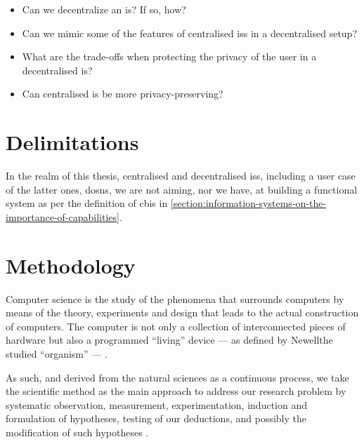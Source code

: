 \documentclass[showtrims, oldfontcommands]{kthesis}
\begin{document}
\begin{itemize}
    \item Can we decentralize an \ac{is}? If so, how?\\
    \item Can we mimic some of the features of centralised \acp{is} in a decentralised setup?\\
    \item What are the trade-offs when protecting the privacy of the user in a decentralised \ac{is}?\\
    \item Can centralised \ac{is} be more privacy-preserving?\\
\end{itemize}

\section{Delimitations}
    \label{section:delimitations}
In the realm of this thesis, centralised and decentralised \acp{is}, including a 
user case of the latter ones, \acp{dosn}, we are not aiming, nor we have, at building 
a functional system as per the definition of \ac{cbis} in \cref{section:information-systems-on-the-importance-of-capabilities}.

\section{Methodology}
    \label{section:methodoloy}
Computer science is the study of the phenomena that surrounds computers by means 
of the theory, experiments and design that leads to the actual construction of computers. 
The computer is not only a collection of interconnected pieces of hardware but also 
a programmed ``living'' device --- as defined by Newell\etal the studied ``organism'' 
--- \cite{NewellS76}.

As such, and derived from the natural sciences as a continuous process, we take 
the scientific method as the main approach to address our research problem by systematic 
observation, measurement, experimentation, induction and formulation of hypotheses, 
testing of our deductions, and possibly the modification of such hypotheses \cite{Oxford14}.
\end{document}
